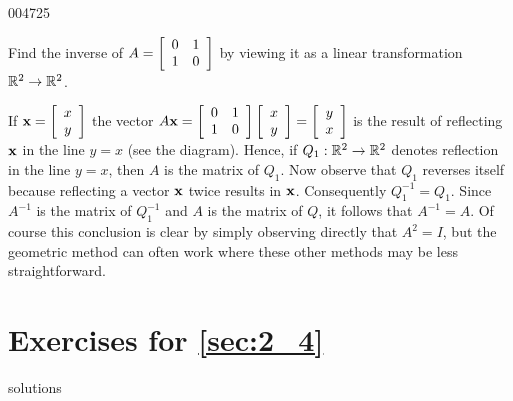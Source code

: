 \begin{example}{}{004725}
\begin{wrapfigure}[7]{l}{5cm}
\centering

\end{wrapfigure}

\setlength{\rightskip}{0pt plus 200pt}
Find the inverse of $A = \left[ \begin{array}{rr}
0 & 1 \\
1 & 0
\end{array} \right]$
 by viewing it as a linear transformation $\mathbb{R}^{2} \to \mathbb{R}^{2}$.

\begin{solution}
  If $\textbf{x} = \left[ \begin{array}{c}
  x \\
  y
  \end{array} \right]$
 the vector $A\textbf{x} = \left[ \begin{array}{rr}
 0 & 1 \\
 1 & 0
 \end{array} \right] \left[ \begin{array}{c}
 x \\
 y
 \end{array} \right] = \left[ \begin{array}{c}
 y \\
 x
 \end{array} \right]$
 is the result of reflecting $\textbf{x}$ in the line $y = x$ (see the diagram). Hence, if $Q_{1} : \mathbb{R}^{2} \to \mathbb{R}^{2}$ denotes reflection in the line $y = x$, then $A$ is the matrix of $Q_{1}$. Now observe that $Q_{1}$ reverses itself because reflecting a vector $\textbf{x}$ twice results in $\textbf{x}$. Consequently $Q_{1}^{-1} = Q_{1}$. Since $A^{-1}$ is the matrix of $Q_{1}^{-1}$ and $A$ is the matrix of $Q$, it follows that $A^{-1} = A$. Of course this conclusion is clear by simply observing directly that $A^{2} = I$, but the geometric method can often work where these other methods may be less straightforward.
\end{solution}
\end{example}

\section*{Exercises for \ref{sec:2_4}}

\begin{Filesave}{solutions}
\end{Filesave}

